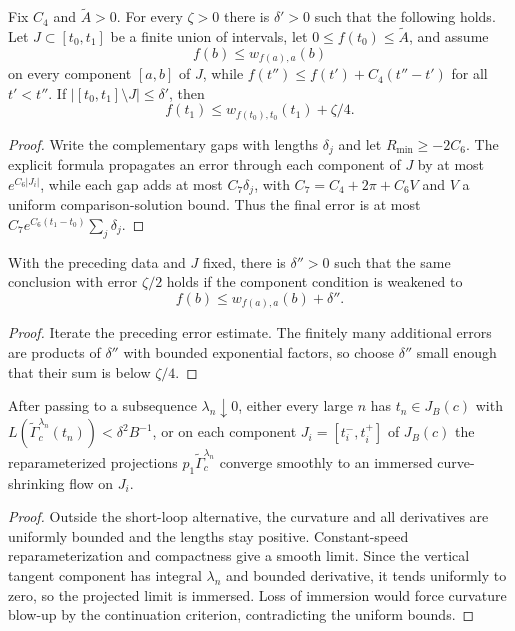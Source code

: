 \begin{claim}
\label{claim:piecewise-domination-estimate}
\label{C1C4delta}
Fix $C_4$ and $\widetilde A>0$. For every $\zeta>0$ there is $\delta'>0$ such
that the following holds. Let $J\subset[t_0,t_1]$ be a finite union of
intervals, let $0\le f(t_0)\le\widetilde A$, and assume
\[
f(b)\le w_{f(a),a}(b)
\]
on every component $[a,b]$ of $J$, while
$f(t'')\le f(t')+C_4(t''-t')$ for all $t'<t''$. If
$|[t_0,t_1]\setminus J|\le\delta'$, then
\[
f(t_1)\le w_{f(t_0),t_0}(t_1)+\zeta/4.
\]
\end{claim}
\begin{proof}
\sketch Write the complementary gaps with lengths $\delta_j$ and let
$R_{\min}\ge-2C_6$. The explicit formula propagates an error through each
component of $J$ by at most $e^{C_6|J_i|}$, while each gap adds at most
$C_7\delta_j$, with $C_7=C_4+2\pi+C_6V$ and $V$ a uniform comparison-solution
bound. Thus the final error is at most
$C_7e^{C_6(t_1-t_0)}\sum_j\delta_j$.
\end{proof}

\begin{claim}
\label{claim:approximate-piecewise-domination-estimate}
\label{deltaprime}
With the preceding data and $J$ fixed, there is $\delta''>0$ such that the
same conclusion with error $\zeta/2$ holds if the component condition is
weakened to
\[
f(b)\le w_{f(a),a}(b)+\delta''.
\]
\end{claim}
\begin{proof}
\sketch Iterate the preceding error estimate. The finitely many additional errors are
products of $\delta''$ with bounded exponential factors, so choose
$\delta''$ small enough that their sum is below $\zeta/4$.
\end{proof}

\begin{claim}
\label{claim:curve-shrinking-flow-limit}
\label{limitcs}
After passing to a subsequence $\lambda_n\downarrow0$, either every large $n$
has $t_n\in J_B(c)$ with
$L(\widetilde\Gamma_c^{\lambda_n}(t_n))<\delta^2B^{-1}$, or on each component
$J_i=[t_i^-,t_i^+]$ of $J_B(c)$ the reparameterized projections
$p_1\widetilde\Gamma_c^{\lambda_n}$ converge smoothly to an immersed
curve-shrinking flow on $J_i$.
\end{claim}
\begin{proof}
\sketch Outside the short-loop alternative, the curvature and all derivatives are
uniformly bounded and the lengths stay positive. Constant-speed
reparameterization and compactness give a smooth limit. Since the vertical
tangent component has integral $\lambda_n$ and bounded derivative, it tends
uniformly to zero, so the projected limit is immersed. Loss of immersion would
force curvature blow-up by the continuation criterion, contradicting the
uniform bounds.
\end{proof}

